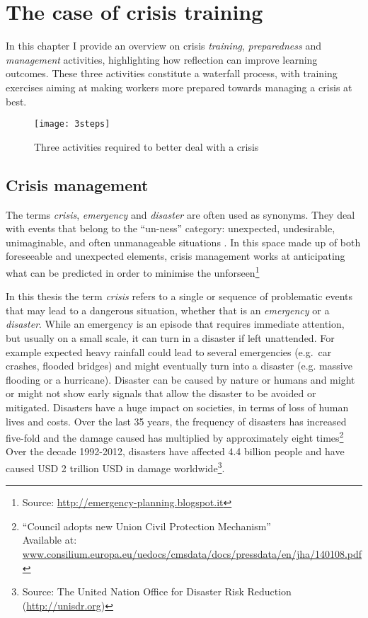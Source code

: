 \chapter{The case of crisis training}\label{crisis}

In this chapter I provide an overview on crisis \emph{training}, \emph{preparedness} and \emph{management} activities, highlighting how reflection can improve learning outcomes. These three activities constitute a waterfall process, with training exercises aiming at making workers more prepared towards managing a crisis at best.

\begin{figure}
	[h!] \centering 
	\texttt{[image: 3steps]} \caption{Three activities required to better deal with a crisis} \label{fig:three-stages} 
\end{figure}


\section{Crisis management}\label{crisis-management}

The terms \emph{crisis}, \emph{emergency} and \emph{disaster} are often used as synonyms. They deal with events that belong to the ``un-ness'' category: unexpected, undesirable, unimaginable, and often unmanageable situations \autocites{Boin:2007wt}{hewit}. In this space made up of both foreseeable and unexpected elements, crisis management works at anticipating what can be predicted in order to minimise the unforseen\footnote{Source: \url{http://emergency-planning.blogspot.it}}

In this thesis the term \emph{crisis} refers to a single or sequence of problematic events that may lead to a dangerous situation, whether that is an \emph{emergency} or a \emph{disaster}. While an emergency is an episode that requires immediate attention, but usually on a small scale, it can turn in a disaster if left unattended. For example expected heavy rainfall could lead to several emergencies (e.g.~car crashes, flooded bridges) and might eventually turn into a disaster (e.g. massive flooding or a hurricane). Disaster can be caused by nature or humans and might or might not show early signals that allow the disaster to be avoided or mitigated. Disasters have a huge impact on societies, in terms of loss of human lives and costs. Over the last 35 years, the frequency of disasters has increased five-fold and the damage caused has multiplied by approximately eight times\footnote{``Council adopts new Union Civil Protection Mechanism'' \\ Available at: \url{www.consilium.europa.eu/uedocs/cmsdata/docs/pressdata/en/jha/140108.pdf}} Over the decade 1992-2012, disasters have affected 4.4 billion people and have caused USD 2 trillion USD in damage worldwide\footnote{Source: The United Nation Office for Disaster Risk Reduction (\url{http://unisdr.org})}.


